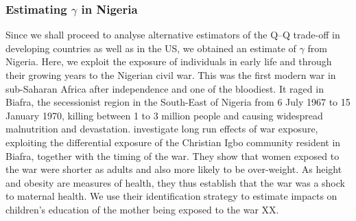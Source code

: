\documentclass[subeqn]{article}
\begin{document}
\begin{spacing}{1.4}
\subsubsection{Estimating $\gamma$ in Nigeria}
\label{sscn:Nigeriagamma}
Since we shall proceed to analyse alternative estimators of the Q--Q trade-off in developing countries as well as in the US, we obtained an estimate of $\gamma$
from Nigeria. Here, we exploit the exposure of individuals in early life and through their growing years to the Nigerian civil war. This was the first modern war in sub-Saharan Africa after independence and
one of the bloodiest. It raged in Biafra, the secessionist region in the South-East of Nigeria from
6 July 1967 to 15 January 1970, killing between 1 to 3 million people and causing widespread malnutrition and devastation. \citep{Akreshetal2012} investigate long run effects of war exposure, exploiting the differential exposure of the Christian Igbo community resident in Biafra, together with the timing of the war. They show that women exposed to the war were shorter as adults and also more likely to be over-weight. As height and obesity are measures of health, they thus establish that the war was a shock to maternal health. We use their identification strategy to estimate impacts on children's education of the mother being exposed to the war XX.


\end{spacing}
\end{document}
